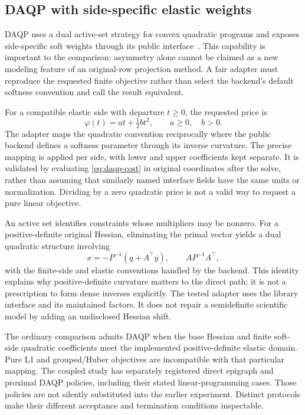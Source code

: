 \subsection{DAQP with side-specific elastic weights}\label{sec:daqp}
DAQP uses a dual active-set strategy for convex quadratic programs and exposes
side-specific soft weights through its public interface~\cite{daqp,goldfarb}.
This capability is important to the comparison: asymmetry alone cannot be
claimed as a new modeling feature of an original-row projection method. A fair
adapter must reproduce the requested finite objective rather than select the
backend's default softness convention and call the result equivalent.

For a compatible elastic side with departure $t\geq0$, the requested price is
\begin{equation}\label{eq:daqp-cost}
 \varphi(t)=a t+\tfrac12 b t^2,\qquad a\geq0,\quad b>0.
\end{equation}
The adapter maps the quadratic convention reciprocally where the public
backend defines a softness parameter through its inverse curvature. The precise
mapping is applied per side, with lower and upper coefficients kept separate.
It is validated by evaluating \eqref{eq:daqp-cost} in original coordinates after
the solve, rather than assuming that similarly named interface fields have the
same units or normalization. Dividing by a zero quadratic price is not a valid
way to request a pure linear objective.

An active set identifies constraints whose multipliers may be nonzero. For a
positive-definite original Hessian, eliminating the primal vector yields a dual
quadratic structure involving
\begin{equation}\label{eq:daqp-dual}
 x=-P^{-1}(q+A^\top y),\qquad
 A P^{-1}A^\top,
\end{equation}
with the finite-side and elastic conventions handled by the backend. This
identity explains why positive-definite curvature matters to the direct path;
it is not a prescription to form dense inverses explicitly. The tested adapter
uses the library interface and its maintained factors. It does not repair a
semidefinite scientific model by adding an undisclosed Hessian shift.

The ordinary comparison admits DAQP when the base Hessian and finite soft-side
quadratic coefficients meet the implemented positive-definite elastic domain.
Pure L1 and grouped/Huber objectives are incompatible with that particular
mapping. The coupled study has separately registered direct epigraph and
proximal DAQP policies, including their stated linear-programming cases. Those
policies are not silently substituted into the earlier experiment. Distinct
protocols make their different acceptance and termination conditions inspectable.

